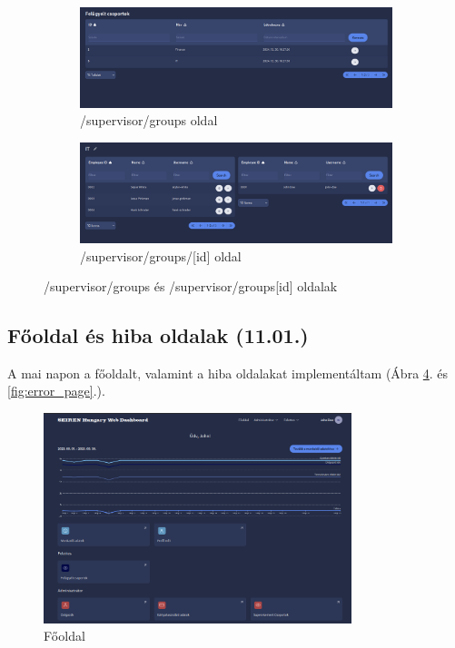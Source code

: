 \documentclass[a4paper]{article}
\begin{document}
\begin{figure}[ht]
    \centering
    \begin{subfigure}[b]{0.8\textwidth}
        \centering
        \includegraphics[width=\textwidth]{images/groups_page.png}
        \caption{/supervisor/groups oldal}
        \label{fig:groups_page}
    \end{subfigure}

    \vspace{1em} %

    \begin{subfigure}[b]{0.8\textwidth}
        \centering
        \includegraphics[width=\textwidth]{images/sup_edit_final.png}
        \caption{/supervisor/groups/[id] oldal}
        \label{fig:groups_id_table}
    \end{subfigure}

    \caption{/supervisor/groups és /supervisor/groups[id] oldalak}
    \label{fig:groups_pages}
\end{figure}

\subsection{Főoldal és hiba oldalak (11.01.)}

A mai napon a főoldalt, valamint a hiba oldalakat implementáltam (Ábra \ref{fig:home_page}. és \ref{fig:error_page}.).

\begin{figure}[ht]
  \centering
  \includegraphics[width = 0.8\textwidth]{images/home_page.png}
  \caption{Főoldal}
  \label{fig:home_page}
\end{figure}
\end{document}
